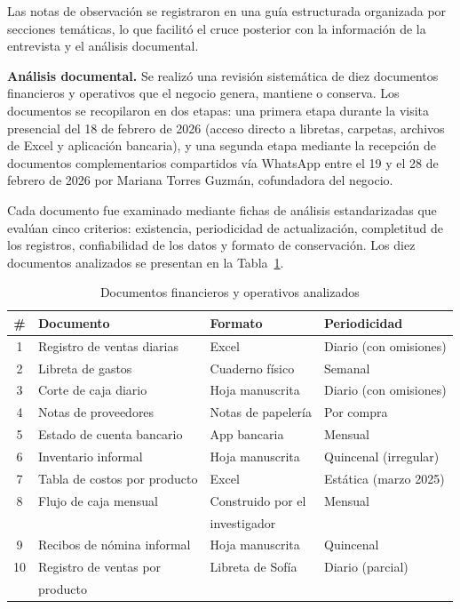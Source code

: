 \documentclass[12pt,letterpaper]{article}
\begin{document}
Las notas de observación se registraron en una guía estructurada organizada por secciones temáticas, lo que facilitó el cruce posterior con la información de la entrevista y el análisis documental.

\textbf{Análisis documental.} Se realizó una revisión sistemática de diez documentos financieros y operativos que el negocio genera, mantiene o conserva. Los documentos se recopilaron en dos etapas: una primera etapa durante la visita presencial del 18 de febrero de 2026 (acceso directo a libretas, carpetas, archivos de Excel y aplicación bancaria), y una segunda etapa mediante la recepción de documentos complementarios compartidos vía WhatsApp entre el 19 y el 28 de febrero de 2026 por Mariana Torres Guzmán, cofundadora del negocio.

Cada documento fue examinado mediante fichas de análisis estandarizadas que evalúan cinco criterios: existencia, periodicidad de actualización, completitud de los registros, confiabilidad de los datos y formato de conservación. Los diez documentos analizados se presentan en la Tabla~\ref{tab:documentos}.

\begin{table}[ht]
\centering
\caption{Documentos financieros y operativos analizados}
\label{tab:documentos}
\begin{tabular}{c l l l}
\toprule
\textbf{\#} & \textbf{Documento} & \textbf{Formato} & \textbf{Periodicidad} \\
\midrule
1  & Registro de ventas diarias    & Excel               & Diario (con omisiones)    \\
2  & Libreta de gastos             & Cuaderno físico      & Semanal                   \\
3  & Corte de caja diario          & Hoja manuscrita      & Diario (con omisiones)    \\
4  & Notas de proveedores          & Notas de papelería   & Por compra                \\
5  & Estado de cuenta bancario     & App bancaria         & Mensual                   \\
6  & Inventario informal           & Hoja manuscrita      & Quincenal (irregular)     \\
7  & Tabla de costos por producto  & Excel                & Estática (marzo 2025)     \\
8  & Flujo de caja mensual         & Construido por el    & Mensual                   \\
   &                               & investigador         &                           \\
9  & Recibos de nómina informal    & Hoja manuscrita      & Quincenal                 \\
10 & Registro de ventas por        & Libreta de Sofía     & Diario (parcial)          \\
   & producto                      &                      &                           \\
\bottomrule
\end{tabular}
\end{table}
\end{document}

